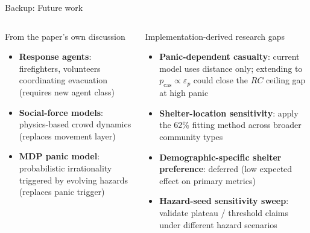 \documentclass[aspectratio=169, xcolor=table]{beamer}
\begin{document}
\begin{frame}[t]{Backup: Future work}
\footnotesize

\begin{columns}[T,onlytextwidth]
\begin{block}{\small From the paper's own discussion}
\scriptsize
\begin{itemize}\itemsep0.25em
  \item \textbf{Response agents}: firefighters, volunteers coordinating evacuation (requires new agent class)
  \item \textbf{Social-force models}: physics-based crowd dynamics (replaces movement layer)
  \item \textbf{MDP panic model}: probabilistic irrationality triggered by evolving hazards (replaces panic trigger)
\end{itemize}
\end{block}

\begin{alertblock}{\small Implementation-derived research gaps}
\scriptsize
\begin{itemize}\itemsep0.25em
  \item \textbf{Panic-dependent casualty}: current model uses distance only; extending to $p_{\text{cas}} \propto \varepsilon_p$ could close the $RC$ ceiling gap at high panic
  \item \textbf{Shelter-location sensitivity}: apply the 62\% fitting method across broader community types
  \item \textbf{Demographic-specific shelter preference}: deferred (low expected effect on primary metrics)
  \item \textbf{Hazard-seed sensitivity sweep}: validate plateau / threshold claims under different hazard scenarios
\end{itemize}
\end{alertblock}
\end{columns}

\vspace{0.6em}
\begin{center}
\end{center}
\end{frame}
\end{document}
